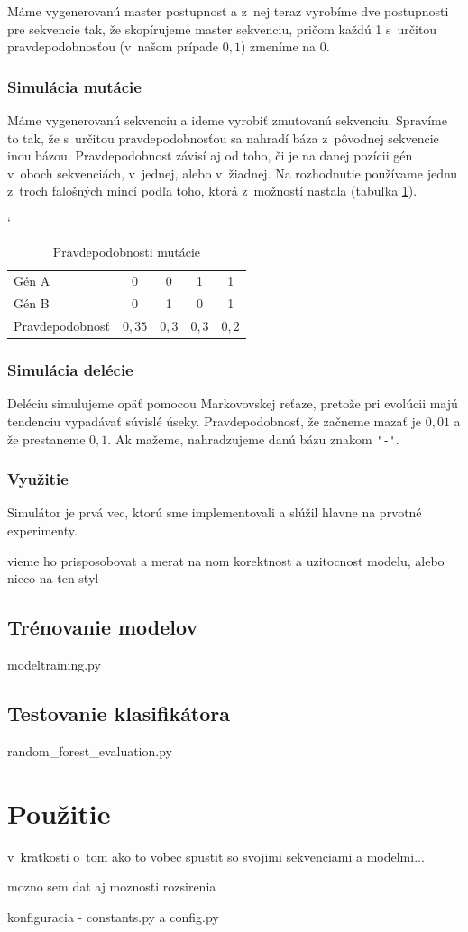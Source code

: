 
Máme vygenerovanú master postupnosť a z~nej teraz vyrobíme dve postupnosti pre sekvencie tak, že skopírujeme master sekvenciu, pričom každú 1 s~určitou pravdepodobnosťou (v~našom prípade $0,1$) zmeníme na 0.

\subsubsection{Simulácia mutácie}

Máme vygenerovanú sekvenciu a ideme vyrobiť zmutovanú sekvenciu. Spravíme to tak, že s~určitou pravdepodobnosťou sa nahradí báza z~pôvodnej sekvencie inou bázou. Pravdepodobnosť závisí aj od toho, či je na danej pozícii gén v~oboch sekvenciách, v~jednej, alebo v~žiadnej. Na rozhodnutie používame jednu z~troch falošných mincí podľa toho, ktorá z~možností nastala (tabuľka \ref{tab:mutation-prob}).

\begin{table}[h]
\catcode` %
\centering
\begin{tabular}{lcccc}
Gén A~& 0 & 0 & 1 & 1\\
Gén B & 0 & 1 & 0 & 1\\
Pravdepodobnosť & $0,35$ & $0,3$ & $0,3$ & $0,2$\\
\end{tabular}
\caption{Pravdepodobnosti mutácie}
\label{tab:mutation-prob}
\end{table}

\subsubsection{Simulácia delécie}
Deléciu simulujeme opäť pomocou Markovovskej reťaze, pretože pri evolúcii majú tendenciu vypadávať súvislé úseky. Pravdepodobnosť, že začneme mazať je $0,01$ a že prestaneme $0,1$.
Ak mažeme, nahradzujeme danú bázu znakom {\verb+'-'+}.

\subsubsection{Využitie}

Simulátor je prvá vec, ktorú sme implementovali a slúžil hlavne na prvotné experimenty.

\todo vieme ho prisposobovat a merat na nom korektnost a uzitocnost modelu, alebo nieco na ten styl

\subsection{Trénovanie modelov}
\todo modeltraining.py

\subsection{Testovanie klasifikátora}
\todo random\_forest\_evaluation.py

\section{Použitie}
\todo v~kratkosti o~tom ako to vobec spustit so svojimi sekvenciami a modelmi...

\todo mozno sem dat aj moznosti rozsirenia

\todo konfiguracia - constants.py a config.py
